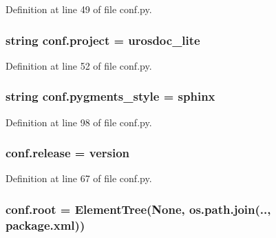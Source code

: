 Definition at line 49 of file conf.\+py.

\subsubsection[{\texorpdfstring{project}{project}}]{\setlength{\rightskip}{0pt plus 5cm}string conf.\+project = u\textquotesingle{}rosdoc\+\_\+lite\textquotesingle{}}\hypertarget{namespaceconf_a45653c983098153b78e33600e39230eb}{}\label{namespaceconf_a45653c983098153b78e33600e39230eb}


Definition at line 52 of file conf.\+py.

\subsubsection[{\texorpdfstring{pygments\+\_\+style}{pygments_style}}]{\setlength{\rightskip}{0pt plus 5cm}string conf.\+pygments\+\_\+style = \textquotesingle{}sphinx\textquotesingle{}}\hypertarget{namespaceconf_a641130e096b26cba8a5d63ed38684de7}{}\label{namespaceconf_a641130e096b26cba8a5d63ed38684de7}


Definition at line 98 of file conf.\+py.

\subsubsection[{\texorpdfstring{release}{release}}]{\setlength{\rightskip}{0pt plus 5cm}conf.\+release = {\bf version}}\hypertarget{namespaceconf_aee93453546a31f4e76999ebaadf6e356}{}\label{namespaceconf_aee93453546a31f4e76999ebaadf6e356}


Definition at line 67 of file conf.\+py.

\subsubsection[{\texorpdfstring{root}{root}}]{\setlength{\rightskip}{0pt plus 5cm}conf.\+root = Element\+Tree(None, os.\+path.\+join(\textquotesingle{}..\textquotesingle{}, \textquotesingle{}package.\+xml\textquotesingle{}))}\hypertarget{namespaceconf_ad32f00e5793a88cf41ae2357bd582ca0}{}\label{namespaceconf_ad32f00e5793a88cf41ae2357bd582ca0}


